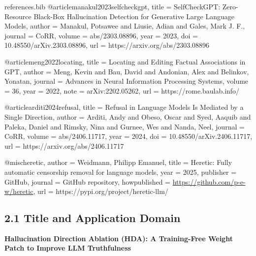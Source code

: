 \begin{filecontents*}{references.bib}
@article{manakul2023selfcheckgpt,
  title   = {SelfCheckGPT: Zero-Resource Black-Box Hallucination Detection for Generative Large Language Models},
  author  = {Manakul, Potsawee and Liusie, Adian and Gales, Mark J. F.},
  journal = {CoRR},
  volume  = {abs/2303.08896},
  year    = {2023},
  doi     = {10.48550/arXiv.2303.08896},
  url     = {https://arxiv.org/abs/2303.08896}
}

@article{meng2022locating,
  title   = {Locating and Editing Factual Associations in {GPT}},
  author  = {Meng, Kevin and Bau, David and Andonian, Alex and Belinkov, Yonatan},
  journal = {Advances in Neural Information Processing Systems},
  volume  = {36},
  year    = {2022},
  note    = {arXiv:2202.05262},
  url     = {https://rome.baulab.info/}
}

@article{arditi2024refusal,
  title   = {Refusal in Language Models Is Mediated by a Single Direction},
  author  = {Arditi, Andy and Obeso, Oscar and Syed, Aaquib and Paleka, Daniel and Rimsky, Nina and Gurnee, Wes and Nanda, Neel},
  journal = {CoRR},
  volume  = {abs/2406.11717},
  year    = {2024},
  doi     = {10.48550/arXiv.2406.11717},
  url     = {https://arxiv.org/abs/2406.11717}
}

@misc{heretic,
  author       = {Weidmann, Philipp Emanuel},
  title        = {Heretic: Fully automatic censorship removal for language models},
  year         = {2025},
  publisher    = {GitHub},
  journal      = {GitHub repository},
  howpublished = {\url{https://github.com/p-e-w/heretic}},
  url          = {https://pypi.org/project/heretic-llm/}
}

\end{filecontents*}

% 


\subsection*{2.1 Title and Application Domain}

\textbf{Hallucination Direction Ablation (HDA): A Training-Free Weight Patch to Improve LLM Truthfulness}


